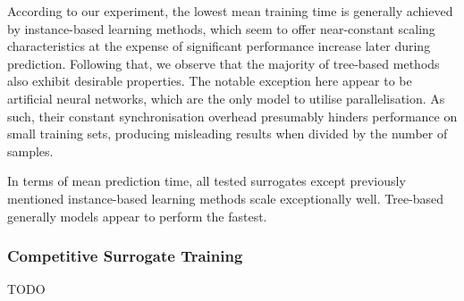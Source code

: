 According to our experiment, the lowest mean training time is generally achieved
by instance-based learning methods, which seem to offer near-constant scaling
characteristics at the expense of significant performance increase later during
prediction. Following that, we observe that the majority of tree-based methods also exhibit
desirable properties. The notable exception here appear to be artificial neural networks,
which are the only model to utilise parallelisation. As such, their constant
synchronisation overhead presumably hinders performance on small training sets,
producing misleading results when divided by the number of samples.

In terms of mean prediction time, all tested surrogates except previously mentioned
instance-based learning methods scale exceptionally well. Tree-based generally
models appear to perform the fastest.



\subsubsection{Competitive Surrogate Training}

TODO

